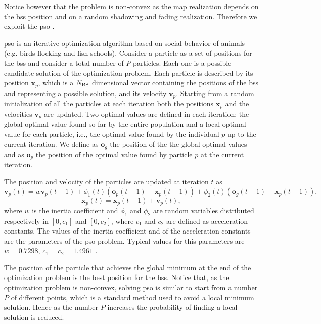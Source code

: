 \documentclass[draftcls,onecolumn,12pt]{IEEEtran}
\begin{document}
Notice however that the problem is non-convex as the map realization depends on the \acp{bs} position and on a random shadowing and fading realization. Therefore we exploit the \ac{pso} \cite{Kennedy-11}.

\ac{pso} is an iterative optimization algorithm based on social behavior of animals (e.g. birds flocking and fish schools). Consider a particle as a set of positions for the \acp{bs} and consider a total number of $P$ particles. Each one is a possible candidate solution of the optimization problem. Each particle is described by its position $\bm{x}_p$, which is a $N_{\rm BS}$ dimensional vector containing the positions of the \acp{bs} and representing a possible solution, and its velocity $\bm{v}_p$.
Starting from a random initialization of all the particles at each iteration both the positions $\bm{x}_p$ and the velocities $\bm{v}_p$ are updated. Two optimal values are defined in each iteration: the global optimal value found so far by the entire population and a local optimal value for each particle, i.e., the optimal value found by the individual $p$ up to the current iteration. We define as $\bm{o}_g$ the position of the the global optimal values and as $\bm{o}_p$ the position of the optimal value found by particle $p$ at the current iteration.

The position and velocity of the particles are updated at iteration $t$ as
 \begin{equation}
 \bm{v}_p(t) = w\bm{v}_p(t-1)+\phi_1(t)(\bm{o}_p(t-1)-\bm{x}_p(t-1))+\phi_2(t)(\bm{o}_g(t-1)-\bm{x}_p(t-1)), 
 \end{equation}
 \begin{equation}
 \bm{x}_p(t) = \bm{x}_p(t-1) + \bm{v}_p(t),
 \end{equation}
where $w$ is the inertia coefficient and $\phi_1$ and $\phi_2$ are random variables distributed respectively in $[0,c_1]$ and $[0,c_2]$, where $c_1$ and $c_2$ are defined as acceleration constants. The values of the inertia coefficient and of the acceleration constants are the parameters of the \ac{pso} problem. Typical values for this parameters are $w=0.7298$, $c_1=c_2=1.4961$ \cite{Kennedy-11}.

The position of the particle that achieves the global minimum at the end of the optimization problem is the best position for the \acp{bs}. Notice that, as the optimization problem is non-convex, solving \ac{pso} is similar to start from a number $P$ of different points, which is a standard method used to avoid a local minimum solution. Hence as the number $P$ increases the probability of finding a local solution is reduced.
\end{document}
